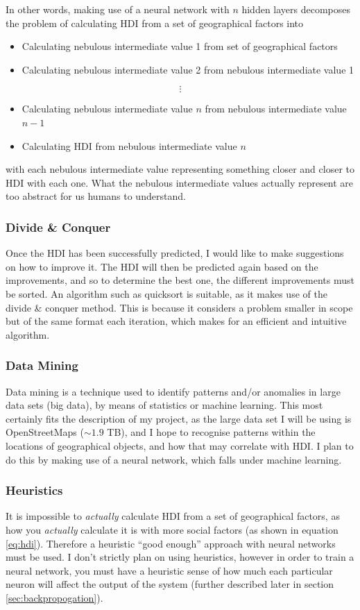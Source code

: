 \documentclass[12pt]{report}
\begin{document}
In other words, making use of a neural network with $n$ hidden layers decomposes the problem of calculating HDI from a set of geographical factors into
\begin{itemize}
\item Calculating nebulous intermediate value 1 from set of geographical factors
\item Calculating nebulous intermediate value 2 from nebulous intermediate value 1
\end{itemize}
$$\vdots$$
\begin{itemize}
\item Calculating nebulous intermediate value $n$ from nebulous intermediate value $n-1$
\item Calculating HDI from nebulous intermediate value $n$
\end{itemize}
with each nebulous intermediate value representing something closer and closer to HDI with each one. What the nebulous intermediate values actually represent are too abstract for us humans to understand.

\subsubsection{Divide \& Conquer}
Once the HDI has been successfully predicted, I would like to make suggestions on how to improve it. The HDI will then be predicted again based on the improvements, and so to determine the best one, the different improvements must be sorted. An algorithm such as quicksort is suitable, as it makes use of the divide \& conquer method. This is because it considers a problem smaller in scope but of the same format each iteration, which makes for an efficient and intuitive algorithm.

\subsubsection{Data Mining}
Data mining is a technique used to identify patterns and/or anomalies in large data sets (big data), by means of statistics or machine learning. This most certainly fits the description of my project, as the large data set I will be using is OpenStreetMaps ($\sim 1.9$ TB), and I hope to recognise patterns within the locations of geographical objects, and how that may correlate with HDI. I plan to do this by making use of a neural network, which falls under machine learning.

\subsubsection{Heuristics}
It is impossible to \textit{actually} calculate HDI from a set of geographical factors, as how you \textit{actually} calculate it is with more social factors (as shown in equation \ref{eq:hdi}). Therefore a heuristic ``good enough'' approach with neural networks must be used. I don't strictly plan on using heuristics, however in order to train a neural network, you must have a heuristic sense of how much each particular neuron will affect the output of the system (further described later in section \ref{sec:backpropogation}).
\end{document}
